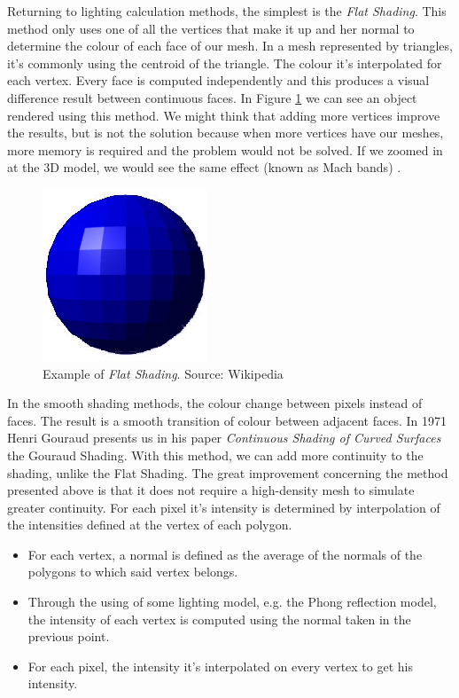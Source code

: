 \documentclass[titlepage,12pt]{report}
\begin{document}
Returning to lighting calculation methods, the simplest is the \textit{Flat Shading}. This method only uses one of all the vertices that make it up and her normal to determine the colour of each face of our mesh. In a mesh represented by triangles, it's commonly using the centroid of the triangle. The colour it's interpolated for each vertex. Every face is computed independently and this produces a visual difference result between continuous faces. In Figure \ref{flat:shading} we can see an object rendered using this method. We might think that adding more vertices improve the results, but is not the solution because when more vertices have our meshes, more memory is required and the problem would not be solved. If we zoomed in at the 3D model, we would see the same effect (known as Mach bands) \citep[pp.~5245--5250]{Lotto1999}.

\begin{figure}[H]
	\centering
	\includegraphics[scale=0.5]{media/Flat-shading-sample.png}
	\caption{Example of \textit{Flat Shading}. Source: Wikipedia}
	\label{flat:shading}
\end{figure}

In the smooth shading methods, the colour change between pixels instead of faces. The result is a smooth transition of colour between adjacent faces.
In 1971 Henri Gouraud presents us in his paper \textit{Continuous Shading of Curved Surfaces} \citep[pp.~623--629]{Henri1971} the Gouraud Shading. With this method, we can add more continuity to the shading, unlike the Flat Shading. The great improvement concerning the method presented above is that it does not require a high-density mesh to simulate greater continuity. For each pixel it's intensity is determined by interpolation of the intensities defined at the vertex of each polygon.

\begin{itemize}
	\item For each vertex, a normal is defined as the average of the normals of the polygons to which said vertex belongs.
	\item Through the using of some lighting model,  e.g. the Phong reflection model, the intensity of each vertex is computed using the normal taken in the previous point.
	\item For each pixel, the intensity it's interpolated on every vertex to get his intensity.
\end{itemize} 
\end{document}
